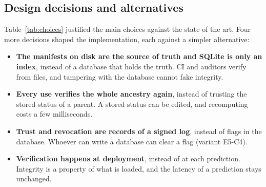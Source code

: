 \subsection{Design decisions and alternatives}
Table~\ref{tab:choices} justified the main choices against the state of the art. Four more decisions shaped
the implementation, each against a simpler alternative:
\begin{itemize}
\item \textbf{The manifests on disk are the source of truth and SQLite is only an index}, instead of a
  database that holds the truth. CI and auditors verify from files, and tampering with the database cannot
  fake integrity.
\item \textbf{Every use verifies the whole ancestry again}, instead of trusting the stored status of a
  parent. A stored status can be edited, and recomputing costs a few milliseconds.
\item \textbf{Trust and revocation are records of a signed log}, instead of flags in the database. Whoever
  can write a database can clear a flag (variant E5-C4).
\item \textbf{Verification happens at deployment}, instead of at each prediction. Integrity is a property of
  what is loaded, and the latency of a prediction stays unchanged.
\end{itemize}
